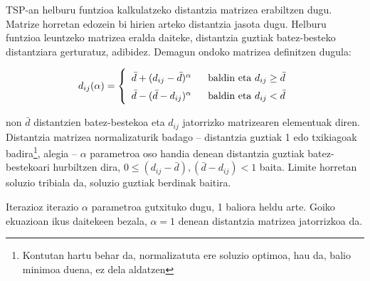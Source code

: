 \documentclass[eu]{ifirak}\usepackage[]{graphicx}\usepackage[]{color}
\begin{document}
\begin{tcolorbox}
\begin{ifexample}

TSP-an helburu funtzioa kalkulatzeko distantzia matrizea erabiltzen dugu. Matrize horretan edozein bi hirien arteko distantzia jasota dugu. Helburu funtzioa leuntzeko matrizea eralda daiteke, distantzia guztiak batez-besteko distantziara gerturatuz, adibidez. Demagun ondoko matrizea definitzen dugula:

\begin{align}
\renewcommand*{\arraystretch}{1.5}
d_{ij}(\alpha) = \left\{
\begin{array}{ll}
\bar{d} + (d_{ij} - \bar{d})^\alpha &\ \ \mbox{baldin eta } d_{ij}\geq \bar{d}\\
\bar{d} - (\bar{d} - d_{ij})^\alpha &\ \ \mbox{baldin eta } d_{ij} < \bar{d}
\end{array}\right.
\end{align}

\noindent non $\bar{d}$ distantzien batez-bestekoa eta $d_{ij}$ jatorrizko matrizearen elementuak diren. Distantzia matrizea normalizaturik badago -- distantzia guztiak 1 edo txikiagoak badira\footnote{Kontutan hartu behar da, normalizatuta ere soluzio optimoa, hau da, balio minimoa duena, ez dela aldatzen}, alegia -- $\alpha$ parametroa oso handia denean distantzia guztiak batez-bestekoari hurbiltzen dira, $0\leq (d_{ij} - \bar{d}),(\bar{d} - d_{ij})<1$ baita. Limite horretan soluzio tribiala da, soluzio guztiak berdinak baitira. 

Iterazioz iterazio $\alpha$ parametroa gutxituko dugu, 1 baliora heldu arte. Goiko ekuazioan ikus daitekeen bezala, $\alpha=1$ denean distantzia matrizea jatorrizkoa da.
\end{ifexample}
\end{tcolorbox}




\end{document}
